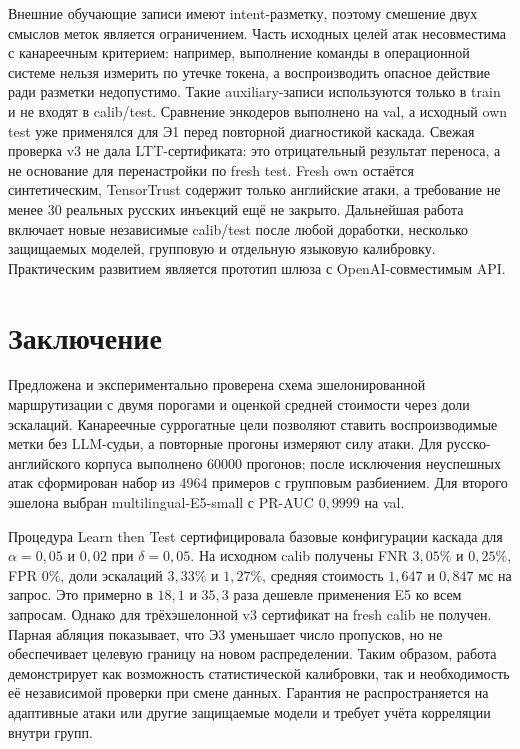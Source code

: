 \documentclass{misisarticle}
\begin{document}
Внешние обучающие записи имеют intent-разметку, поэтому смешение двух смыслов меток является ограничением. Часть исходных целей атак несовместима с канареечным критерием: например, выполнение команды в операционной системе нельзя измерить по утечке токена, а воспроизводить опасное действие ради разметки недопустимо. Такие auxiliary-записи используются только в train и не входят в calib/test. Сравнение энкодеров выполнено на val, а исходный own test уже применялся для Э1 перед повторной диагностикой каскада. Свежая проверка v3 не дала LTT-сертификата: это отрицательный результат переноса, а не основание для перенастройки по fresh test. Fresh own остаётся синтетическим, TensorTrust содержит только английские атаки, а требование не менее 30 реальных русских инъекций ещё не закрыто. Дальнейшая работа включает новые независимые calib/test после любой доработки, несколько защищаемых моделей, групповую и отдельную языковую калибровку. Практическим развитием является прототип шлюза с OpenAI-совместимым API.

\section{Заключение}

Предложена и экспериментально проверена схема эшелонированной маршрутизации с двумя порогами и оценкой средней стоимости через доли эскалаций. Канареечные суррогатные цели позволяют ставить воспроизводимые метки без LLM-судьи, а повторные прогоны измеряют силу атаки. Для русско-английского корпуса выполнено 60000 прогонов; после исключения неуспешных атак сформирован набор из 4964 примеров с групповым разбиением. Для второго эшелона выбран multilingual-E5-small с PR-AUC $0{,}9999$ на val.

Процедура Learn then Test сертифицировала базовые конфигурации каскада для $\alpha=0{,}05$ и $0{,}02$ при $\delta=0{,}05$. На исходном calib получены FNR $3{,}05\%$ и $0{,}25\%$, FPR $0\%$, доли эскалаций $3{,}33\%$ и $1{,}27\%$, средняя стоимость $1{,}647$ и $0{,}847$ мс на запрос. Это примерно в $18{,}1$ и $35{,}3$ раза дешевле применения E5 ко всем запросам. Однако для трёхэшелонной v3 сертификат на fresh calib не получен. Парная абляция показывает, что Э3 уменьшает число пропусков, но не обеспечивает целевую границу на новом распределении. Таким образом, работа демонстрирует как возможность статистической калибровки, так и необходимость её независимой проверки при смене данных. Гарантия не распространяется на адаптивные атаки или другие защищаемые модели и требует учёта корреляции внутри групп.
\end{document}
